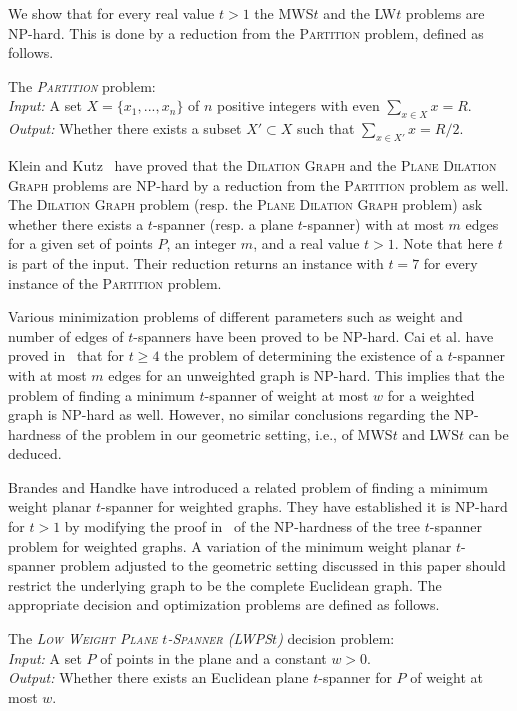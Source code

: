 \documentclass[a4paper]{llncs}
\begin{document}
We show that for every real value $t>1$ the MWS$t$ and the LW$t$ problems are NP-hard.
This is done by a reduction 
from the \textsc{Partition} problem, defined as follows.
\begin{myproblem}\label{prob:Partition}
The \emph{\textsc{Partition}} problem:\\
\emph{Input:} A set $X=\{x_1,...,x_n\}$ of $n$ positive integers with even $\sum_{x \in X}x=R$.\\
\emph{Output:} Whether there exists a subset $X'\subset X$ such that $\sum_{x \in X'} x =R/2$.
\end{myproblem}
Klein and Kutz~\cite{KleinK06} have proved that the \textsc{Dilation Graph} 
and the \textsc{Plane Dilation Graph} problems are NP-hard by a reduction 
from the \textsc{Partition} problem as well.
The \textsc{Dilation Graph} problem (resp. the \textsc{Plane Dilation Graph} problem)
ask whether there exists a $t$-spanner (resp.  a plane $t$-spanner) with at most $m$ edges for a given 
set of points $P$, an integer $m$, and a real value $t>1$.
Note that here $t$ is part of the input. Their reduction returns an instance with $t=7$
for every instance of the \textsc{Partition} problem.



Various minimization problems of different parameters such as weight and number of edges 
of $t$-spanners have been proved to be NP-hard.
Cai et al. have proved in~\cite{Cai94} that for $t \geq 4$ the problem of determining the existence of 
a $t$-spanner with at most $m$ edges for an unweighted graph is NP-hard.
This implies that the problem of finding a minimum
$t$-spanner of weight at most $w$ for a weighted graph is NP-hard as well.
However, no similar conclusions regarding the NP-hardness of the problem 
in our geometric setting, i.e., of MWS$t$ and LWS$t$ can be deduced. 

Brandes and Handke have introduced a related problem of finding a minimum weight planar $t$-spanner
for weighted graphs. They have established it is NP-hard for $t>1$ by modifying the proof in~\cite{CaiC95}
of the NP-hardness of the tree $t$-spanner problem for weighted graphs.
A variation of the minimum weight planar $t$-spanner problem adjusted to the geometric 
setting discussed in this paper should restrict the underlying graph to be the complete Euclidean graph.
The appropriate decision and optimization problems are defined as follows.
\begin{myproblem}\label{prob:LWPS$t$}
The \emph{\textsc{Low Weight Plane $t$-Spanner} (LWPS$t$)} decision problem:\\
\emph{Input:} A set $P$ of points in the plane and a constant $w>0$.\\
\emph{Output:} Whether there exists an Euclidean plane $t$-spanner for $P$ of weight at most $w$.
\end{myproblem}
\end{document}
